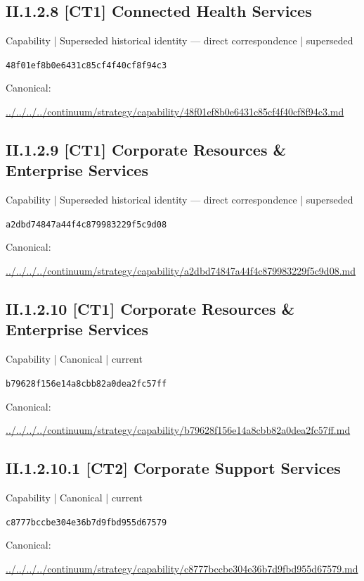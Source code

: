 \documentclass[10pt,a4paper]{article}
\begin{document}
\subsection*{II.1.2.8 [CT1] Connected Health Services}
{\small Capability | Superseded historical identity — direct correspondence | superseded}\par
\texttt{48f01ef8b0e6431c85cf4f40cf8f94c3}\par
Canonical: \par
{\footnotesize\url{../../../../continuum/strategy/capability/48f01ef8b0e6431c85cf4f40cf8f94c3.md}}\par
\subsection*{II.1.2.9 [CT1] Corporate Resources \& Enterprise Services}
{\small Capability | Superseded historical identity — direct correspondence | superseded}\par
\texttt{a2dbd74847a44f4c879983229f5c9d08}\par
Canonical: \par
{\footnotesize\url{../../../../continuum/strategy/capability/a2dbd74847a44f4c879983229f5c9d08.md}}\par
\subsection*{II.1.2.10 [CT1] Corporate Resources \& Enterprise Services}
{\small Capability | Canonical | current}\par
\texttt{b79628f156e14a8cbb82a0dea2fc57ff}\par
Canonical: \par
{\footnotesize\url{../../../../continuum/strategy/capability/b79628f156e14a8cbb82a0dea2fc57ff.md}}\par
\subsection*{II.1.2.10.1 [CT2] Corporate Support Services}
{\small Capability | Canonical | current}\par
\texttt{c8777bccbe304e36b7d9fbd955d67579}\par
Canonical: \par
{\footnotesize\url{../../../../continuum/strategy/capability/c8777bccbe304e36b7d9fbd955d67579.md}}\par
\end{document}
